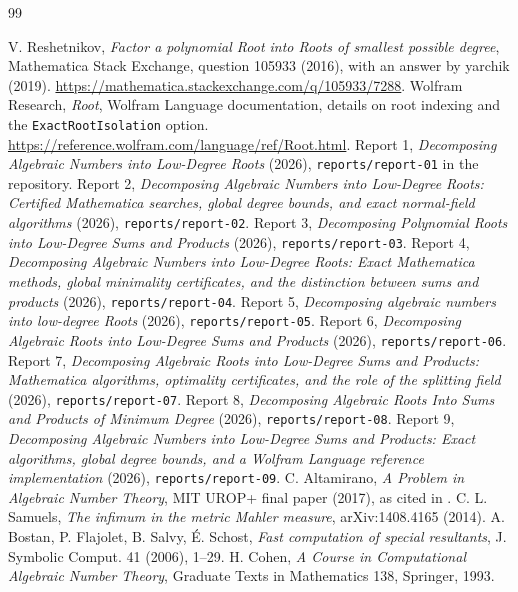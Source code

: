 \documentclass[11pt,a4paper]{article}
\theoremstyle{definition}
\theoremstyle{remark}
\newcommand{\code}[1]{\texttt{#1}}
\begin{document}
\begin{thebibliography}{99}\raggedright\sloppy
{} V. Reshetnikov, \emph{Factor a polynomial Root into Roots of smallest possible
  degree}, Mathematica Stack Exchange, question 105933 (2016), with an answer by yarchik (2019).
  \url{https://mathematica.stackexchange.com/q/105933/7288}.
 Wolfram Research, \emph{Root}, Wolfram Language documentation,
  details on root indexing and the \code{ExactRootIsolation} option.
  \url{https://reference.wolfram.com/language/ref/Root.html}.
 Report 1, \emph{Decomposing Algebraic Numbers into Low-Degree Roots} (2026),
  \code{reports/report-01} in the repository.
 Report 2, \emph{Decomposing Algebraic Numbers into Low-Degree Roots: Certified Mathematica
  searches, global degree bounds, and exact normal-field algorithms} (2026), \code{reports/report-02}.
 Report 3, \emph{Decomposing Polynomial Roots into Low-Degree Sums and Products} (2026),
  \code{reports/report-03}.
 Report 4, \emph{Decomposing Algebraic Numbers into Low-Degree Roots: Exact Mathematica
  methods, global minimality certificates, and the distinction between sums and products} (2026),
  \code{reports/report-04}.
 Report 5, \emph{Decomposing algebraic numbers into low-degree Roots} (2026),
  \code{reports/report-05}.
 Report 6, \emph{Decomposing Algebraic Roots into Low-Degree Sums and Products} (2026),
  \code{reports/report-06}.
 Report 7, \emph{Decomposing Algebraic Roots into Low-Degree Sums and Products: Mathematica
  algorithms, optimality certificates, and the role of the splitting field} (2026),
  \code{reports/report-07}.
 Report 8, \emph{Decomposing Algebraic Roots Into Sums and Products of Minimum Degree}
  (2026), \code{reports/report-08}.
 Report 9, \emph{Decomposing Algebraic Numbers into Low-Degree Sums and Products: Exact
  algorithms, global degree bounds, and a Wolfram Language reference implementation} (2026),
  \code{reports/report-09}.
 C. Altamirano, \emph{A Problem in Algebraic Number Theory}, MIT UROP+ final
  paper (2017), as cited in \cite{r1,r3,r7}.
 C. L. Samuels, \emph{The infimum in the metric Mahler measure}, arXiv:1408.4165
  (2014).
 A. Bostan, P. Flajolet, B. Salvy, \'E. Schost, \emph{Fast computation of special
  resultants}, J. Symbolic Comput. 41 (2006), 1--29.
 H. Cohen, \emph{A Course in Computational Algebraic Number Theory}, Graduate Texts in
  Mathematics 138, Springer, 1993.

\end{thebibliography}
\end{document}
